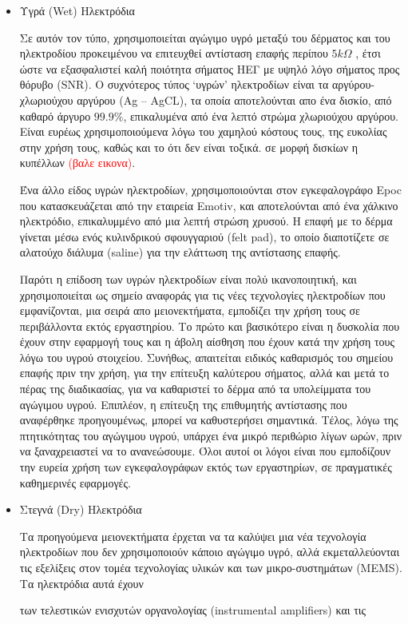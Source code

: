 \documentclass[11pt,a4paper,english,greek,twoside]{../Thesis}
\begin{document}
\begin{itemize}
    \item{Υγρά (Wet) Ηλεκτρόδια}
    \par Σε αυτόν τον τύπο, χρησιμοποιείται αγώγιμο υγρό μεταξύ του δέρματος και του ηλεκτροδίου προκειμένου να επιτευχθεί αντίσταση επαφής περίπου $5kΩ$ \cite{}, έτσι ώστε να εξασφαλιστεί καλή ποιότητα σήματος ΗΕΓ με υψηλό λόγο σήματος προς θόρυβο (SNR). Ο συχνότερος τύπος ‘υγρών’ ηλεκτροδίων είναι τα αργύρου-χλωριούχου αργύρου (Ag – AgCL), τα οποία αποτελούνται απο ένα δισκίο, από καθαρό άργυρο $99.9\% $, επικαλυμένα από ένα λεπτό στρώμα χλωριούχου αργύρου. Είναι ευρέως χρησιμοποιούμενα λόγω του χαμηλού κόστους τους, της ευκολίας στην χρήση τους, καθώς και το ότι δεν είναι τοξικά. σε μορφή δισκίων η κυπέλλων \textcolor{red}{(βαλε εικονα)}.  
    \par Ένα άλλο είδος υγρών ηλεκτροδίων, χρησιμοποιούνται στον εγκεφαλογράφο Epoc που κατασκευάζεται από την εταιρεία Emotiv, και αποτελούνται από ένα χάλκινο ηλεκτρόδιο, επικαλυμμένο από μια λεπτή στρώση χρυσού. Η επαφή με το δέρμα γίνεται μέσω ενός κυλινδρικού σφουγγαριού (felt pad), το οποίο διαποτίζετε σε αλατούχο διάλυμα (saline) για την ελάττωση της αντίστασης επαφής.
    \par Παρότι η επίδοση των υγρών ηλεκτροδίων είναι πολύ ικανοποιητική, και χρησιμοποιείται ως σημείο αναφοράς για τις νέες τεχνολογίες ηλεκτροδίων που εμφανίζονται, μια σειρά απο μειονεκτήματα, εμποδίζει την χρήση τους σε περιβάλλοντα εκτός εργαστηρίου. Το πρώτο και βασικότερο είναι η δυσκολία που έχουν στην εφαρμογή τους και η άβολη αίσθηση που έχουν κατά την χρήση τους λόγω του υγρού στοιχείου. Συνήθως, απαιτείται ειδικός καθαρισμός  του σημείου επαφής πριν την χρήση, για την επίτευξη καλύτερου σήματος, αλλά και μετά το πέρας της διαδικασίας, για να καθαριστεί το δέρμα από  τα υπολείμματα του αγώγιμου υγρού. Επιπλέον, η επίτευξη της επιθυμητής αντίστασης που αναφέρθηκε προηγουμένως, μπορεί να καθυστερήσει σημαντικά. Τέλος, λόγω της πτητικότητας του αγώγιμου υγρού, υπάρχει ένα μικρό περιθώριο λίγων ωρών, πριν να ξαναχρειαστεί να το ανανεώσουμε. Όλοι αυτοί οι λόγοι είναι που εμποδίζουν την ευρεία χρήση των εγκεφαλογράφων εκτός των εργαστηρίων, σε πραγματικές καθημερινές εφαρμογές.
    
    \item{Στεγνά (Dry) Ηλεκτρόδια}
    \par Τα προηγούμενα μειονεκτήματα έρχεται να τα καλύψει μια νέα τεχνολογία ηλεκτροδίων που δεν χρησιμοποιούν κάποιο αγώγιμο υγρό, αλλά εκμεταλλεύονται τις εξελίξεις στον τομέα τεχνολογίας υλικών και των μικρο-συστημάτων (MEMS). Τα ηλεκτρόδια αυτά έχουν 

    των τελεστικών ενισχυτών οργανολογίας (instrumental amplifiers) και τις


\end{itemize}
\end{document}
